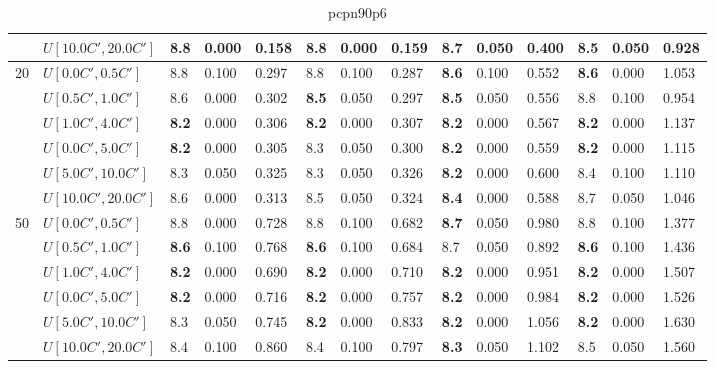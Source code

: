 \begin{table}[h]
{\begin{tabular}{|l|l||l|l|l||l|l|l||l|l|l||l|l|l|}
       & $U[10.0C',20.0C']$ & 8.8 & 0.000 & 0.158 & 8.8 & 0.000 & 0.159 & 8.7 & 0.050 & 0.400 & \textbf{8.5} & 0.050 & 0.928 \\
      \hline\hline
      \multirow{6}{*}{20} & $U[0.0C',0.5C']$ & 8.8 & 0.100 & 0.297 & 8.8 & 0.100 & 0.287 & \textbf{8.6} & 0.100 & 0.552 & \textbf{8.6} & 0.000 & 1.053 \\
       & $U[0.5C',1.0C']$ & 8.6 & 0.000 & 0.302 & \textbf{8.5} & 0.050 & 0.297 & \textbf{8.5} & 0.050 & 0.556 & 8.8 & 0.100 & 0.954 \\
       & $U[1.0C',4.0C']$ & \textbf{8.2} & 0.000 & 0.306 & \textbf{8.2} & 0.000 & 0.307 & \textbf{8.2} & 0.000 & 0.567 & \textbf{8.2} & 0.000 & 1.137 \\
       & $U[0.0C',5.0C']$ & \textbf{8.2} & 0.000 & 0.305 & 8.3 & 0.050 & 0.300 & \textbf{8.2} & 0.000 & 0.559 & \textbf{8.2} & 0.000 & 1.115 \\
       & $U[5.0C',10.0C']$ & 8.3 & 0.050 & 0.325 & 8.3 & 0.050 & 0.326 & \textbf{8.2} & 0.000 & 0.600 & 8.4 & 0.100 & 1.110 \\
       & $U[10.0C',20.0C']$ & 8.6 & 0.000 & 0.313 & 8.5 & 0.050 & 0.324 & \textbf{8.4} & 0.000 & 0.588 & 8.7 & 0.050 & 1.046 \\
      \hline\hline
      \multirow{6}{*}{50} & $U[0.0C',0.5C']$ & 8.8 & 0.000 & 0.728 & 8.8 & 0.100 & 0.682 & \textbf{8.7} & 0.050 & 0.980 & 8.8 & 0.100 & 1.377 \\
       & $U[0.5C',1.0C']$ & \textbf{8.6} & 0.100 & 0.768 & \textbf{8.6} & 0.100 & 0.684 & 8.7 & 0.050 & 0.892 & \textbf{8.6} & 0.100 & 1.436 \\
       & $U[1.0C',4.0C']$ & \textbf{8.2} & 0.000 & 0.690 & \textbf{8.2} & 0.000 & 0.710 & \textbf{8.2} & 0.000 & 0.951 & \textbf{8.2} & 0.000 & 1.507 \\
       & $U[0.0C',5.0C']$ & \textbf{8.2} & 0.000 & 0.716 & \textbf{8.2} & 0.000 & 0.757 & \textbf{8.2} & 0.000 & 0.984 & \textbf{8.2} & 0.000 & 1.526 \\
       & $U[5.0C',10.0C']$ & 8.3 & 0.050 & 0.745 & \textbf{8.2} & 0.000 & 0.833 & \textbf{8.2} & 0.000 & 1.056 & \textbf{8.2} & 0.000 & 1.630 \\
       & $U[10.0C',20.0C']$ & 8.4 & 0.100 & 0.860 & 8.4 & 0.100 & 0.797 & \textbf{8.3} & 0.050 & 1.102 & 8.5 & 0.050 & 1.560 \\
      \hline
      \end{tabular}
      }
      \caption{pcpn90p6}
      \label{tab:pcpn90p6}\end{table}

